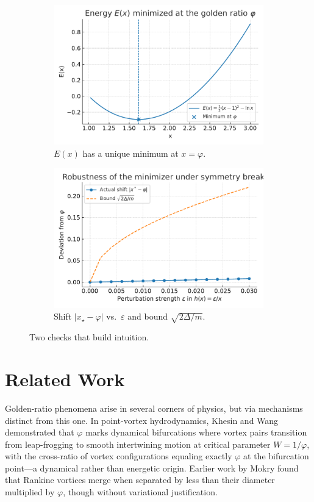 \documentclass[11pt]{article}
\theoremstyle{remark}
\theoremstyle{definition}
\newcommand{\ph}{\varphi}
\newcommand{\eps}{\varepsilon}
\begin{document}
\begin{figure}[t]
  \centering
  \begin{subfigure}{0.48\linewidth}
    \centering
    \includegraphics[width=\linewidth]{E_of_x_min_at_phi.pdf}
    \caption{$E(x)$ has a unique minimum at $x=\ph$.}
  \end{subfigure}\hfill
  \begin{subfigure}{0.48\linewidth}
    \centering
    \includegraphics[width=\linewidth]{robustness_shift_vs_epsilon.pdf}
    \caption{Shift $|x_\star-\ph|$ vs.\ $\eps$ and bound $\sqrt{2\Delta/m}$.}
  \end{subfigure}
  \caption{Two checks that build intuition.}
\end{figure}

\FloatBarrier

\section{Related Work}
Golden-ratio phenomena arise in several corners of physics, but via mechanisms distinct from this one. In point-vortex hydrodynamics, Khesin and Wang \cite{khesin2021} demonstrated that $\ph$ marks dynamical bifurcations where vortex pairs transition from leap-frogging to smooth intertwining motion at critical parameter $W=1/\ph$, with the cross-ratio of vortex configurations equaling exactly $\ph$ at the bifurcation point---a dynamical rather than energetic origin. Earlier work by Mokry \cite{mokry2008} found that Rankine vortices merge when separated by less than their diameter multiplied by $\ph$, though without variational justification.
\end{document}
